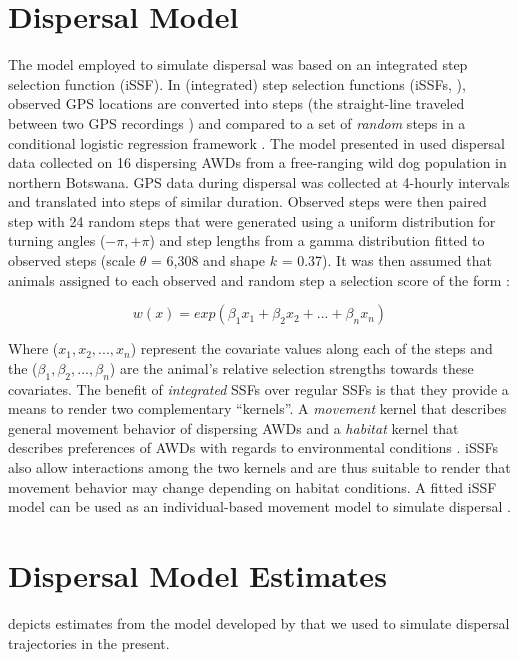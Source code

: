 \documentclass[../FinalThesis.tex]{subfiles}
\begin{document}
\newpage
\section{Dispersal Model}
\label{DispersalModel}
The model employed to simulate dispersal was based on an integrated step
selection function (iSSF). In (integrated) step selection functions (iSSFs,
\citealp{Fortin.2005, Avgar.2016}), observed GPS locations are converted into
steps (the straight-line traveled between two GPS recordings
\citep{Turchin.1998}) and compared to a set of \textit{random} steps in a
conditional logistic regression framework \citep{Fortin.2005, Thurfjell.2014,
Muff.2020, Fieberg.2021}. The model presented in \citep{Hofmann.2023} used
dispersal data collected on 16 dispersing AWDs from a free-ranging wild dog
population in northern Botswana. GPS data during dispersal was collected at
4-hourly intervals and translated into steps of similar duration. Observed steps
were then paired step with 24 random steps that were generated using a uniform
distribution for turning angles (\(-\pi, +\pi\)) and step lengths from a gamma
distribution fitted to observed steps (scale \(\theta\) = 6,308 and shape \(k\)
= 0.37). It was then assumed that animals assigned to each observed and random
step a selection score of the form \citep{Fortin.2005}:

\begin{equation}
  w(x) = exp(\beta_1 x_1 + \beta_2 x_2 + ... + \beta_n x_n)
\end{equation}

Where (\(x_1, x_2, ..., x_n\)) represent the covariate values along each of the
steps and the (\(\beta_1, \beta_2, ..., \beta_n\)) are the animal's relative
selection strengths \citep{Avgar.2017} towards these covariates. The benefit
of \textit{integrated} SSFs over regular SSFs is that they provide a means to
render two complementary ``kernels''. A \textit{movement} kernel that describes
general movement behavior of dispersing AWDs and a \textit{habitat} kernel that
describes preferences of AWDs with regards to environmental conditions
\citep{Fieberg.2021}. iSSFs also allow interactions among the two kernels and
are thus suitable to render that movement behavior may change depending on
habitat conditions. A fitted iSSF model can be used as an individual-based
movement model to simulate dispersal \citep{Signer.2017, Hofmann.2023}.

\newpage
\section{Dispersal Model Estimates}
 depicts estimates from the model developed by \citet{Hofmann.2023}
that we used to simulate dispersal trajectories in the present.
\end{document}
